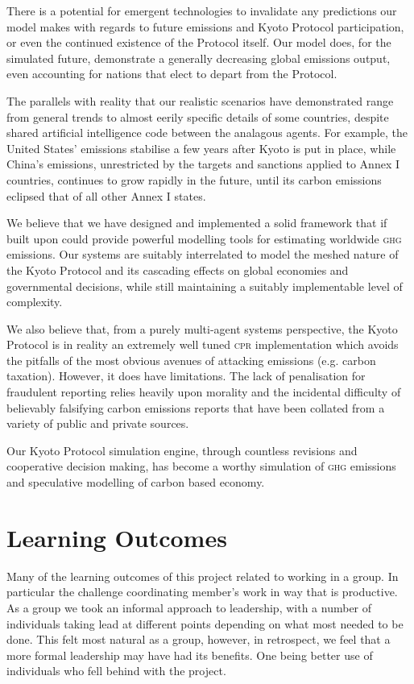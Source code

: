 There is a potential for emergent technologies to invalidate any predictions our model makes with regards to future emissions and Kyoto Protocol participation, or even the continued existence of the Protocol itself. Our model does, for the simulated future, demonstrate a generally decreasing global emissions output, even accounting for nations that elect to depart from the Protocol.

The parallels with reality that our realistic scenarios have demonstrated range from general trends to almost eerily specific details of some countries, despite shared artificial intelligence code between the analagous agents. For example, the United States' emissions stabilise a few years after Kyoto is put in place, while China's emissions, unrestricted by the targets and sanctions applied to Annex I countries, continues to grow rapidly in the future, until its carbon emissions eclipsed that of all other Annex I states.

We believe that we have designed and implemented a solid framework that if built upon could provide powerful modelling tools for estimating worldwide \textsc{ghg} emissions. Our systems are suitably interrelated to model the meshed nature of the Kyoto Protocol and its cascading effects on global economies and governmental decisions, while still maintaining a suitably implementable level of complexity.

We also believe that, from a purely multi-agent systems perspective, the Kyoto Protocol is in reality an extremely well tuned \textsc{cpr} implementation which avoids the pitfalls of the most obvious avenues of attacking \CO emissions (e.g. carbon taxation). However, it does have limitations. The lack of penalisation for fraudulent reporting relies heavily upon morality and the incidental difficulty of believably falsifying carbon emissions reports that have been collated from a variety of public and private sources.

Our Kyoto Protocol simulation engine, through countless revisions and cooperative decision making, has become a worthy simulation of \textsc{ghg} emissions and speculative modelling of carbon based economy.

\section{Learning Outcomes}

Many of the learning outcomes of this project related to working in a group. In particular the challenge coordinating member's work in way that is productive. As a group we took an informal approach to leadership, with a number of individuals taking lead at different points depending on what most needed to be done. This felt most natural as a group, however, in retrospect, we feel that a more formal leadership may have had its benefits. One being better use of individuals who fell behind with the project.

